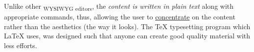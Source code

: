 \documentclass{article}
\begin{document}
	Unlike other \textsubscript{WYSIWYG editors}, the \emph{content is written in plain text} along with appropriate commands, thus, allowing the user to \underline{concentrate} on the content rather than the aesthetics (the way it looks). The {\Huge TeX} typesetting program which LaTeX uses, was designed such that anyone can create good quality {\footnotesize material with less efforts.}

    \tiny
    \lipsum[1-2]
    \normalsize
    \lipsum[3-4]
\end{document}
